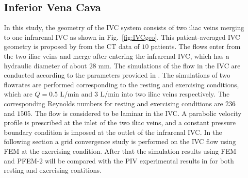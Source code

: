 \subsection{Inferior Vena Cava}

In this study, the geometry of the IVC system consists of two iliac veins merging to one infrarenal IVC as shown in Fig.~\ref{fig:IVCgeo}. This patient-averaged IVC geometry is proposed by \cite{gallagher_exp} from the CT data of $10$ patients. The flows enter from the two iliac veins and merge after entering the infrarenal IVC, which has a hydraulic diameter of about $28$ mm. 
The simulations of the flow in the IVC are conducted according to the parameters provided in \cite{craven_cfd}. The simulations of two flowrates are performed corresponding to the resting and exercising conditions, which are $Q=0.5$ L/min and $3$ L/min into two iliac veins respectively. The corresponding Reynolds numbers for resting and exercising conditions are $236$ and $1505$. The flow is considered to be laminar in the IVC. A parabolic velocity profile is prescribed at the inlet of the two iliac veins, and a constant pressure boundary condition is imposed at the outlet of the infrarenal IVC.
In the following section a grid convergence study is performed on the IVC flow using FEM at the exercising condition. After that the simulation results using FEM and PFEM-2 will be compared with the PIV experimental results in \cite{gallagher_exp} for both resting and exercising contitions. 

